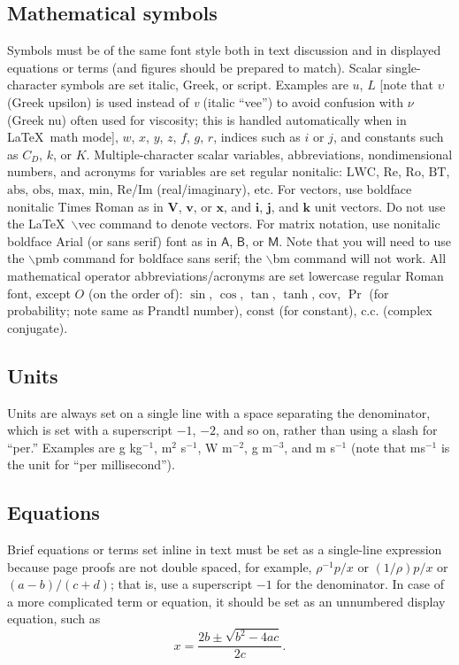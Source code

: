 \documentclass{ametsoc}
\begin{document}
\subsection{Mathematical symbols}
Symbols must be of the same font style both in text discussion and in
displayed equations or terms (and figures should be prepared to match).
Scalar single-character symbols are set italic, Greek, or script. Examples
are $u$, $L$ [note that $\upsilon$ (Greek upsilon) is used instead of
\textit{v} (italic ``vee'') to avoid confusion with $\nu$ (Greek nu) often
used for viscosity; this is handled automatically when in \LaTeX\ math mode],
$w$, $x$, $y$, $z$, $f$, $g$, $r$, indices such as $i$ or $j$, and constants
such as $C_D$, $k$, or $K$. Multiple-character scalar variables,
abbreviations, nondimensional numbers, and acronyms for variables are set
regular nonitalic: $\mathrm{LWC}$, $\mathrm{Re}$, $\mathrm{Ro}$,
$\mathrm{BT}$, $\mathrm{abs}$, $\mathrm{obs}$, $\mathrm{max}$,
$\mathrm{min}$, $\mathrm{Re}$/$\mathrm{Im}$ (real/imaginary), etc. For
vectors, use boldface nonitalic Times Roman as in $\mathbf{V}$, $\mathbf{v}$,
or $\mathbf{x}$, and $\mathbf{i}$, $\mathbf{j}$, and $\mathbf{k}$ unit
vectors. Do not use the \LaTeX\ $\backslash$vec command to denote vectors.
For matrix notation, use nonitalic boldface Arial (or sans serif) font as in
$\pmb{\mathsf{A}}$, $\pmb{\mathsf{B}}$, or $\pmb{\mathsf{M}}$. Note that you will need to use the 
$\backslash$pmb command for boldface sans serif; the $\backslash$bm command will not work. All mathematical
operator abbreviations/acronyms are set lowercase regular Roman font, except
$O$ (on the order of): $\sin$, $\cos$, $\tan$, $\tanh$, $\mathrm{cov}$, $\Pr$
(for probability; note same as Prandtl number), $\mathrm{const}$ (for
constant), $\mathrm{c.c.}$ (complex conjugate).

\subsection{Units}
Units are always set on a single line with a space separating the
denominator, which is set with a superscript $-1$, $-2$, and so on, rather
than using a slash for ``per.'' Examples are g kg$^{-1}$, m$^2$ s$^{-1}$, W
m$^{-2}$, g m$^{-3}$, and m s$^{-1}$ (note that ms$^{-1}$ is the unit for
``per millisecond'').

\subsection{Equations}
Brief equations or terms set inline in text must be set as a single-line
expression because page proofs are not double spaced, for example,
$\rho^{-1}p/x$ or $(1/{\rho})p/x$ or $(a-b)/(c+d)$; that is, use a
superscript $-1$ for the denominator. In case of a more complicated term or
equation, it should be set as an unnumbered display equation, such as
\begin{displaymath} x=\frac{2b\pm\sqrt{b^{2}-4ac}}{2c}.  \end{displaymath}
\end{document}

